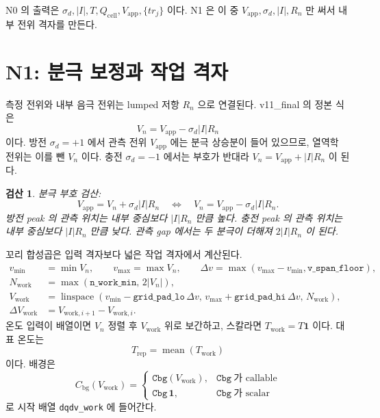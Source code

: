 \documentclass[11pt,a4paper]{article}
\newtheorem*{verifybox}{검산}
\newcommand{\app}{\mathrm{app}}
\newcommand{\cell}{\mathrm{cell}}
\newcommand{\bg}{\mathrm{bg}}
\newcommand{\work}{\mathrm{work}}
\newcommand{\rep}{\mathrm{rep}}
\begin{document}
N0 의 출력은 $\sigma_d,|I|,T,Q_\cell,V_\app,\{tr_j\}$ 이다. N1 은 이 중 $V_\app,\sigma_d,|I|,R_n$ 만 써서 내부 전위 격자를 만든다.

\section{N1: 분극 보정과 작업 격자}\label{sec:n1}
측정 전위와 내부 음극 전위는 lumped 저항 $R_n$ 으로 연결된다. v11\_final 의 정본 식은
\begin{equation}
\boxed{\;V_n=V_\app-\sigma_d|I|R_n\;}
\label{eq:polarization}
\end{equation}
이다. 방전 $\sigma_d=+1$ 에서 관측 전위 $V_\app$ 에는 분극 상승분이 들어 있으므로, 열역학 전위는 이를 뺀 $V_n$ 이다. 충전 $\sigma_d=-1$ 에서는 부호가 반대라 $V_n=V_\app+|I|R_n$ 이 된다.

\begin{verifybox}
분극 부호 검산:
\begin{equation}
V_\app=V_n+\sigma_d|I|R_n
\quad\Longleftrightarrow\quad
V_n=V_\app-\sigma_d|I|R_n.
\label{eq:polarcheck}
\end{equation}
방전 peak 의 관측 위치는 내부 중심보다 $|I|R_n$ 만큼 높다. 충전 peak 의 관측 위치는 내부 중심보다 $|I|R_n$ 만큼 낮다. 관측 gap 에서는 두 분극이 더해져 $2|I|R_n$ 이 된다.
\end{verifybox}

꼬리 합성곱은 입력 격자보다 넓은 작업 격자에서 계산된다.
\begin{align}
v_{\min}&=\min V_n,\qquad v_{\max}=\max V_n,\qquad
\Delta v=\max(v_{\max}-v_{\min},\texttt{v\_span\_floor}),\label{eq:vspan}\\
N_{\work}&=\max(\texttt{n\_work\_min},\,2|V_n|),\label{eq:nwork}\\
V_{\work}&=\operatorname{linspace}(v_{\min}-\texttt{grid\_pad\_lo}\,\Delta v,\,
v_{\max}+\texttt{grid\_pad\_hi}\,\Delta v,\,N_{\work}),\label{eq:vwork}\\
\Delta V_{\work}&=V_{\work,i+1}-V_{\work,i}.
\label{eq:gridstep}
\end{align}
온도 입력이 배열이면 $V_n$ 정렬 후 $V_{\work}$ 위로 보간하고, 스칼라면 $T_{\work}=T\mathbf 1$ 이다. 대표 온도는
\begin{equation}
T_{\rep}=\operatorname{mean}(T_{\work})
\label{eq:Trep}
\end{equation}
이다. 배경은
\begin{equation}
C_\bg(V_{\work})=
\begin{cases}
\texttt{Cbg}(V_{\work}),&\texttt{Cbg}\ \text{가 callable}\\
\texttt{Cbg}\,\mathbf 1,&\texttt{Cbg}\ \text{가 scalar}
\end{cases}
\label{eq:Cbg}
\end{equation}
로 시작 배열 \texttt{dqdv\_work} 에 들어간다.
\end{document}
